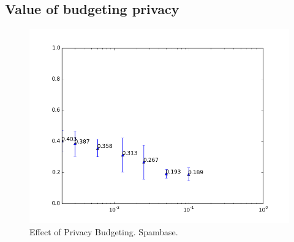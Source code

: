 \subsection{Value of budgeting privacy}

\begin{figure}[H]
	\centering
	\includegraphics[width=.8\textwidth]{fig/spambase/eps0.1,buddiv1-64,peers10,groups5,reg2e-2-puball-budgeting-data300-spam-testmean}
	\caption{Effect of Privacy Budgeting. Spambase.}
	\label{fig:results_privacy_budget_spam}
\end{figure}